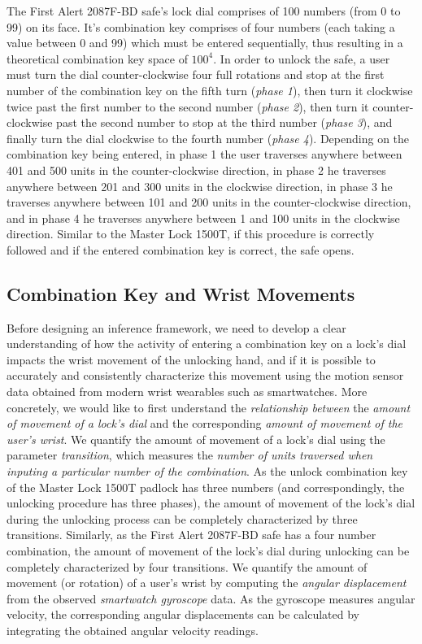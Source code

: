 \documentclass[]{IEEEtran}
\begin{document}
The First Alert 2087F-BD safe's lock dial comprises of 100 numbers (from 0 to 99) on its face. It's combination key comprises of four numbers (each taking a value between 0 and 99) which must be entered sequentially, thus resulting in a theoretical combination key space of $100^4$. In order to unlock the safe, a user must turn the dial counter-clockwise four full rotations and stop at the first number of the combination key on the fifth turn (\emph{phase 1}), then turn it clockwise twice past the first number to the second number (\emph{phase 2}), then turn it counter-clockwise past the second number to stop at the third number (\emph{phase 3}), and finally turn the dial clockwise to the fourth number (\emph{phase 4}). Depending on the combination key being entered, in phase 1 the user traverses anywhere between 401 and 500 units in the counter-clockwise direction, in phase 2 he traverses anywhere between 201 and 300 units in the clockwise direction, in phase 3 he traverses anywhere between 101 and 200 units in the counter-clockwise direction, and in phase 4 he traverses anywhere between 1 and 100 units in the clockwise direction. Similar to the Master Lock 1500T, if this procedure is correctly followed and if the entered combination key is correct, the safe opens.

\subsection{Combination Key and Wrist Movements}
\label{wristmovements}
Before designing an inference framework, we need to develop a clear understanding of how the activity of entering a combination key on a lock's dial impacts the wrist movement of the unlocking hand, and if it is possible to accurately and consistently characterize this movement using the motion sensor data obtained from modern wrist wearables such as smartwatches. More concretely, we would like to first understand the \emph{relationship between} the \emph{amount of movement of a lock's dial} and the corresponding \emph{amount of movement of the user's wrist}. We quantify the amount of movement of a lock's dial using the parameter \emph{transition}, which measures the \emph{number of units traversed when inputing a particular number of the combination}. As the unlock combination key of the Master Lock 1500T padlock has three numbers (and correspondingly, the unlocking procedure has three phases), the amount of movement of the lock's dial during the unlocking process can be completely characterized by three transitions. Similarly, as the First Alert 2087F-BD safe has a four number combination, the amount of movement of the lock's dial during unlocking can be completely characterized by four transitions. We quantify the amount of movement (or rotation) of a user's wrist by computing the \emph{angular displacement} from the observed \emph{smartwatch gyroscope} data. As the gyroscope measures angular velocity, the corresponding angular displacements can be calculated by integrating the obtained angular velocity readings.
\end{document}
